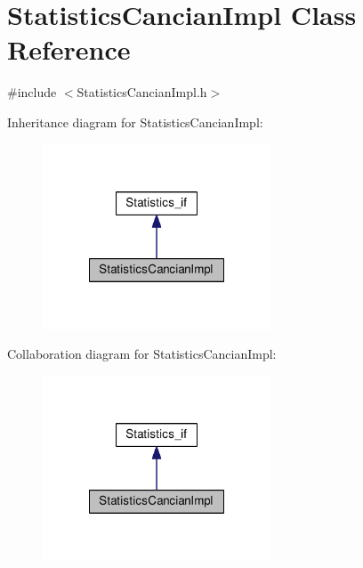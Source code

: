 \hypertarget{class_statistics_cancian_impl}{\section{Statistics\-Cancian\-Impl Class Reference}
\label{class_statistics_cancian_impl}
}


{\ttfamily \#include $<$Statistics\-Cancian\-Impl.\-h$>$}



Inheritance diagram for Statistics\-Cancian\-Impl\-:
\nopagebreak
\begin{figure}[H]
\begin{center}
\leavevmode
\includegraphics[width=192pt]{class_statistics_cancian_impl__inherit__graph}
\end{center}
\end{figure}


Collaboration diagram for Statistics\-Cancian\-Impl\-:
\nopagebreak
\begin{figure}[H]
\begin{center}
\leavevmode
\includegraphics[width=192pt]{class_statistics_cancian_impl__coll__graph}
\end{center}
\end{figure}
